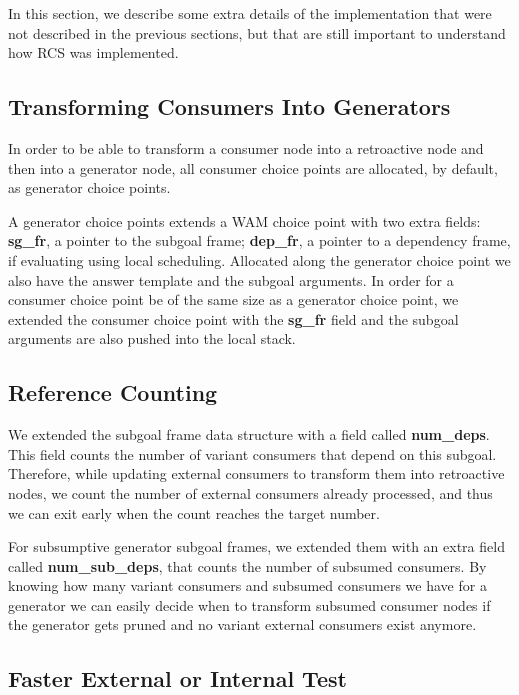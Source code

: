 In this section, we describe some extra details of the implementation that were not described
in the previous sections, but that are still important to understand how RCS was implemented.

\subsection{Transforming Consumers Into Generators}

In order to be able to transform a consumer node into a retroactive node and then into a generator node,
all consumer choice points are allocated, by default, as generator choice points.

A generator choice points extends a WAM choice point with two extra fields:
\textbf{sg\_fr}, a pointer to the subgoal frame; \textbf{dep\_fr}, a pointer to a dependency frame,
if evaluating using local scheduling. Allocated along the generator choice point we also have the answer
template and the subgoal arguments. In order for a consumer choice point be of the same size as a
generator choice point, we extended the consumer choice point with the \textbf{sg\_fr} field and
the subgoal arguments are also pushed into the local stack.

\subsection{Reference Counting}

We extended the subgoal frame data structure with a field called \textbf{num\_deps}. This field
counts the number of variant consumers that depend on this subgoal. Therefore, while updating
external consumers to transform them into retroactive nodes, we count the number of external consumers
already processed, and thus we can exit early when the count reaches the target number.

For subsumptive generator subgoal frames, we extended them with an extra field called \textbf{num\_sub\_deps}, that
counts the number of subsumed consumers. By knowing how many variant consumers and subsumed consumers we
have for a generator we can easily decide when to transform subsumed consumer nodes if the generator gets
pruned and no variant external consumers exist anymore.

\subsection{Faster External or Internal Test}\label{sec:faster_test}

